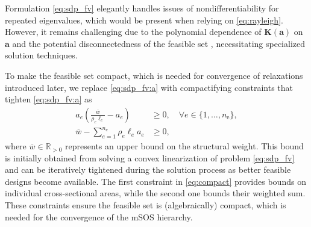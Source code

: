 \documentclass[preprint,3p]{elsarticle}
\newcommand{\nel}{n_\mathrm{e}}
\newcommand{\marouan}[1]{{\color{purple}#1}}
\numberwithin{equation}{section}
\begin{document}
Formulation \eqref{eq:sdp_fv} elegantly handles issues of nondifferentiability for repeated eigenvalues, which would be present when relying on \eqref{eq:rayleigh}. However, it remains challenging due to the polynomial dependence of $\mathbf{K}(\mathbf{a})$ on $\mathbf{a}$ and the potential disconnectedness of the feasible set \citep{Ni2014,Tyburec2024global}, necessitating specialized solution techniques.

To make the feasible set compact, which is needed for convergence of relaxations introduced later, we replace \eqref{eq:sdp_fv:a} with compactifying constraints that tighten \eqref{eq:sdp_fv:a} as
%
\begin{subequations}\label{eq:compact}
  \begin{align}
    a_e \left(\frac{\overline{w}}{\rho_e \ell_e}- a_e\right) & \geq 0, \quad \forall e \in \{1,\dots,\nel\}, \\
    \overline{w} - \sum_{e=1}^{\nel} \rho_e \ell_e a_e & \geq 0,
  \end{align}
\end{subequations}
%
where $\overline{w} \in \mathbb{R}_{>0}$ represents an upper bound on the structural weight. This bound is initially obtained from solving a convex linearization of problem \eqref{eq:sdp_fv} \citep[Lemma 3.9]{Tyburec2024global} and can be iteratively tightened during the solution process as better feasible designs become available. The first constraint in \eqref{eq:compact} provides bounds on individual cross-sectional areas, while the second one bounds their weighted sum. 
These constraints ensure the feasible set is (algebraically) compact, which is needed for the convergence of the mSOS hierarchy. 

\end{document}
